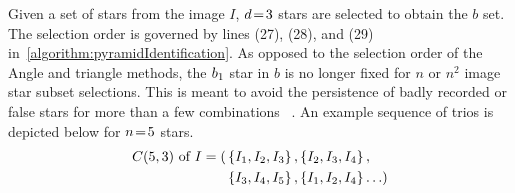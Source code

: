\begin{algorithm}
\end{algorithm}

Given a set of stars from the image $I$, $d \!=\! 3$ stars are selected to obtain the $b$ set.
The selection order is governed by lines (27), (28), and (29) in~\autoref{algorithm:pyramidIdentification}.
As opposed to the selection order of the Angle and triangle methods, the $b_1$ star in $b$ is no longer fixed
for $n$ or $n^2$ image star subset selections.
This is meant to avoid the persistence of badly recorded or false stars for more than a few combinations
~\cite{motari:pyramidIdentification}.
An example sequence of trios is depicted below for $n \!=\! 5$ stars.
\begin{equation}
    \begin{aligned}
        C(5, 3) \text{ of } I = ( &\left\{ I_1, I_2, I_3 \right\}, \left\{ I_2, I_3, I_4 \right\}, \\
        &\left\{ I_3, I_4, I_5 \right\}, \left\{ I_1, I_2, I_4  \right\}\ldots )
    \end{aligned}
\end{equation}

